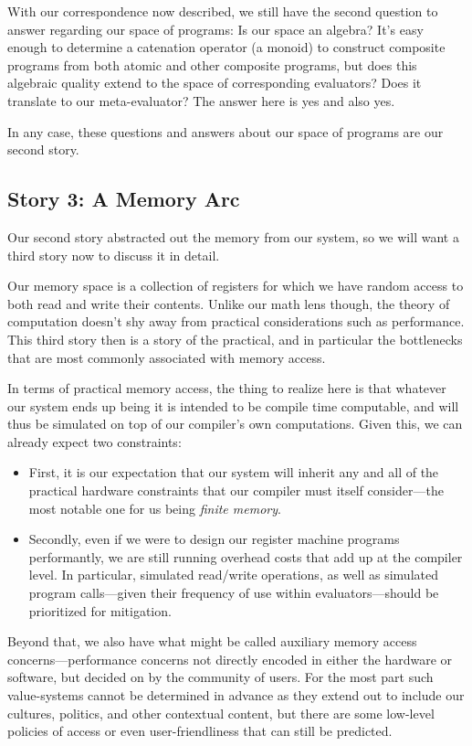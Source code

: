 \documentclass[twoside]{article}
\begin{document}
With our correspondence now described, we still have the second question to answer regarding our space of programs:
Is our space an algebra? It's easy enough to determine a catenation operator (a monoid) to construct composite programs
from both atomic and other composite programs, but does this algebraic quality extend to the space of corresponding
evaluators? Does it translate to our meta-evaluator? The answer here is yes and also yes.

In any case, these questions and answers about our space of programs are our second story.

\subsection*{Story 3: A Memory Arc}

Our second story abstracted out the memory from our system, so we will want a third story now to discuss it in detail.

Our memory space is a collection of registers for which we have random access to both read and write their contents.
Unlike our math lens though, the theory of computation doesn't shy away from practical considerations such as
performance. This third story then is a story of the practical, and in particular the bottlenecks that
are most commonly associated with memory access.

In terms of practical memory access, the thing to realize here is that whatever our system ends up being it is intended
to be compile time computable, and will thus be simulated on top of our compiler's own computations. Given this, we can
already expect two constraints:

\begin{itemize}
\item First, it is our expectation that our system will inherit any and all of the practical hardware
constraints that our compiler must itself consider---the most notable one for us being \emph{finite memory}.
\item Secondly, even if we were to design our register machine programs performantly, we are still running overhead
costs that add up at the compiler level. In particular, simulated read/write operations, as well as simulated program
calls---given their frequency of use within evaluators---should be prioritized for mitigation.
\end{itemize}

Beyond that, we also have what might be called auxiliary memory access concerns---performance concerns not directly
encoded in either the hardware or software, but decided on by the community of users. For the most part such value-systems
cannot be determined in advance as they extend out to include our cultures, politics, and other contextual content,
but there are some low-level policies of access or even user-friendliness that can still be predicted.
\end{document}
